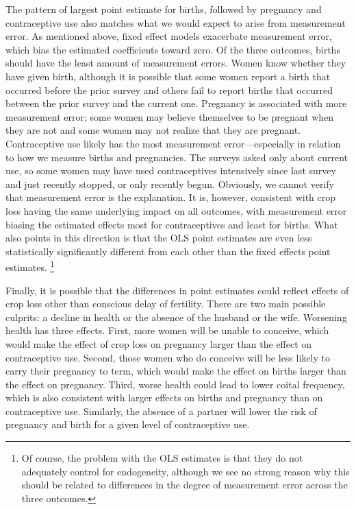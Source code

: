 \documentclass[letterpaper,12pt]{article}
\begin{document}
The pattern of largest point estimate for births, followed by
pregnancy and contraceptive use also matches what we would 
expect to arise from measurement error.
As mentioned above, fixed effect models exacerbate measurement error, 
which bias the estimated coefficients toward zero.
Of the three outcomes, births should have the least amount of 
measurement errors.
Women know whether they have given birth, 
although it is possible that some women report a birth that occurred 
before the prior survey and others fail to report births that 
occurred between the prior survey and the current one.
Pregnancy is associated with more measurement error;
some women may believe themselves to be pregnant when they are
not and some women may not realize that they are pregnant.
Contraceptive use likely has the most measurement 
error---especially in relation to how we measure births and pregnancies.
The surveys asked only about current use, so some women may
have used contraceptives intensively since last survey and 
just recently stopped, or only recently begun.
Obviously, we cannot verify that measurement error is the explanation.
It is, however, consistent with crop loss having the same underlying impact on 
all outcomes, with measurement error biasing the estimated effects most 
for contraceptives and least for births.
What also points in this direction is that the OLS point estimates 
are even less statistically significantly different from each other
than the fixed effects point estimates.%
\footnote{
Of course, the problem with the OLS estimates is that they
do not adequately control for endogeneity, although we see
no strong reason why this should be related to differences
in the degree of measurement error across the three outcomes.
}

Finally, it is possible that the differences in point estimates 
could reflect effects of crop loss other than conscious 
delay of fertility.
There are two main possible culprits: a decline in health
or the absence of the husband or the wife.
Worsening health has three effects.
First, more women will be unable to conceive, which would make
the effect of crop loss on pregnancy larger than the effect
on contraceptive use.
Second, those women who do conceive will be less likely to carry their 
pregnancy to term, which would make the effect on births 
larger than the effect on pregnancy.
Third, worse health could lead to lower coital frequency,
which is also consistent with larger effects on births and
pregnancy than on contraceptive use.
Similarly, the absence of a partner will lower the risk of
pregnancy and birth for a given level of contraceptive use.
\end{document}
